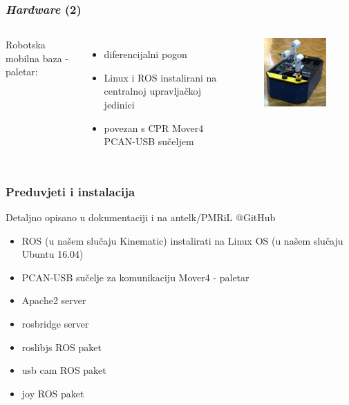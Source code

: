 \documentclass{beamer}
\begin{document}
\begin{frame}
    \frametitle{\emph{Hardware} (2)}
    \begin{columns}
        Robotska mobilna baza - paletar:\newline
        \begin{itemize}
                \item diferencijalni pogon
                \item Linux i ROS instalirani na centralnoj upravljačkoj jedinici
                \item povezan s CPR Mover4 PCAN-USB sučeljem
        \end{itemize}

        \begin{figure}
            \centering
            \includegraphics[width=50mm]{paletar.png}
        \end{figure}
    \end{columns}
\end{frame}

\begin{frame}
    \frametitle{Preduvjeti i instalacija}
    Detaljno opisano u dokumentaciji i na antelk/PMRiL @GitHub\newline
    \begin{itemize}
        \item ROS (u našem slučaju Kinematic) instalirati na Linux OS (u našem slučaju Ubuntu 16.04)
        \item PCAN-USB sučelje za komunikaciju Mover4 - paletar
        \item Apache2 server
        \item rosbridge server
        \item roslibjs ROS paket
        \item usb cam ROS paket
        \item joy ROS paket
    \end{itemize}
\end{frame}
\end{document}
